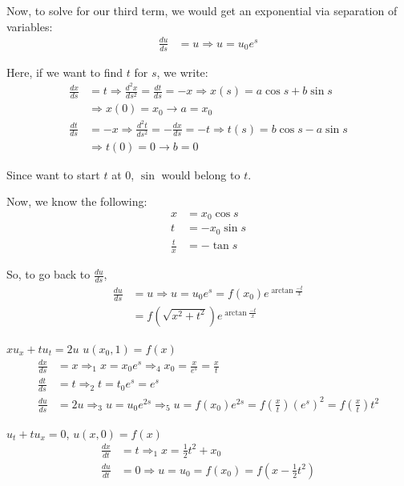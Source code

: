   Now, to solve for our third term, we would get an exponential via separation of variables:
  \begin{align}
    \frac{du}{ds} & = u \Rightarrow u = u_0 e^s
  \end{align}

  Here, if we want to find $t$ for $s$, we write:
  \begin{align}
    \frac{dx}{ds} & = t \Rightarrow \frac{d^2x}{ds^2} = \frac{dt}{ds} = -x
    \Rightarrow x(s) = a \cos s + b \sin s\\
    & \Rightarrow x(0) = x_0 \rightarrow a = x_0\\
    \frac{dt}{ds} & = -x \Rightarrow \frac{d^2t}{ds^2} = -\frac{dx}{ds} = -t
    \Rightarrow t(s) = b \cos s - a \sin s\\
    & \Rightarrow t(0) = 0 \rightarrow b = 0
  \end{align}

  Since want to start $t$ at $0$, $\sin$ would belong to $t$.

  Now, we know the following:
  \begin{align}
    x & = x_0 \cos s\\
    t & = -x_0 \sin s\\
    \frac{t}{x} & = - \tan s
  \end{align}

  So, to go back to $\frac{du}{ds}$,
  \begin{align}
    \frac{du}{ds} & = u \Rightarrow u = u_0 e^s
    = f(x_0) e^{\arctan \frac{-t}{x}}\\
    & = f\left( \sqrt{x^2 + t^2} \right) e^{\arctan \frac{-t}{x}}
  \end{align}

  \ex $xu_x + tu_t = 2u$ \quad $u(x_0, 1) = f(x)$
  \begin{align}
    \frac{dx}{ds} & = x \Rightarrow_1 x = x_0 e^s \Rightarrow_4 x_0
    = \frac{x}{e^s} = \frac{x}{t}\\
    \frac{dt}{ds} & = t \Rightarrow_2 t = t_0 e^s = e^s\\
    \frac{du}{ds} & = 2u \Rightarrow_3 u = u_0 e^{2s}
    \Rightarrow_5 u = f(x_0) e^{2s} = f\left(\frac{x}{t}\right)(e^s)^2
    = f\left(\frac{x}{t}\right)t^2
  \end{align}

  \ex $u_t + tu_x = 0$, $u(x, 0) = f(x)$
  \begin{align}
    \frac{dx}{dt} & = t \Rightarrow_1 x = \frac{1}{2}t^2 + x_0\\
    \frac{du}{dt} & = 0 \Rightarrow u = u_0 = f(x_0) = f\left(x - \frac{1}{2} t^2\right)
  \end{align}

